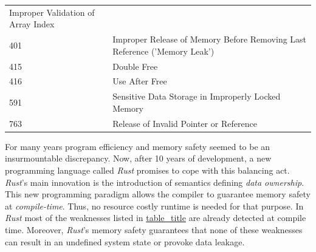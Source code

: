 \begin{longtable}[]{@{}ll@{}}
\begin{minipage}[t]{0.75\columnwidth}
Improper Validation of Array Index\strut
\end{minipage}\tabularnewline
\begin{minipage}[t]{0.19\columnwidth}\raggedright\strut
401\strut
\end{minipage} & \begin{minipage}[t]{0.75\columnwidth}\raggedright\strut
Improper Release of Memory Before Removing Last Reference ('Memory
Leak')\strut
\end{minipage}\tabularnewline
\begin{minipage}[t]{0.19\columnwidth}\raggedright\strut
415\strut
\end{minipage} & \begin{minipage}[t]{0.75\columnwidth}\raggedright\strut
Double Free\strut
\end{minipage}\tabularnewline
\begin{minipage}[t]{0.19\columnwidth}\raggedright\strut
416\strut
\end{minipage} & \begin{minipage}[t]{0.75\columnwidth}\raggedright\strut
Use After Free\strut
\end{minipage}\tabularnewline
\begin{minipage}[t]{0.19\columnwidth}\raggedright\strut
591\strut
\end{minipage} & \begin{minipage}[t]{0.75\columnwidth}\raggedright\strut
Sensitive Data Storage in Improperly Locked Memory\strut
\end{minipage}\tabularnewline
\begin{minipage}[t]{0.19\columnwidth}\raggedright\strut
763\strut
\end{minipage} & \begin{minipage}[t]{0.75\columnwidth}\raggedright\strut
Release of Invalid Pointer or Reference\strut
\end{minipage}\tabularnewline
\bottomrule
\end{longtable}

For many years program efficiency and memory safety seemed to be an
insurmountable discrepancy. Now, after 10 years of development, a new
programming language called \emph{Rust} promises to cope with this
balancing act. \emph{Rust}'s main innovation is the introduction of
semantics defining \emph{data ownership}. This new programming paradigm
allows the compiler to guarantee memory safety at \emph{compile-time}.
Thus, no resource costly runtime is needed for that purpose. In
\emph{Rust} most of the weaknesses listed in
\protect\hyperlink{c-memory-safety-bugs}{table\_title} are already
detected at compile time. Moreover, \emph{Rust}'s memory safety
guarantees that none of these weaknesses can result in an undefined
system state or provoke data leakage.

